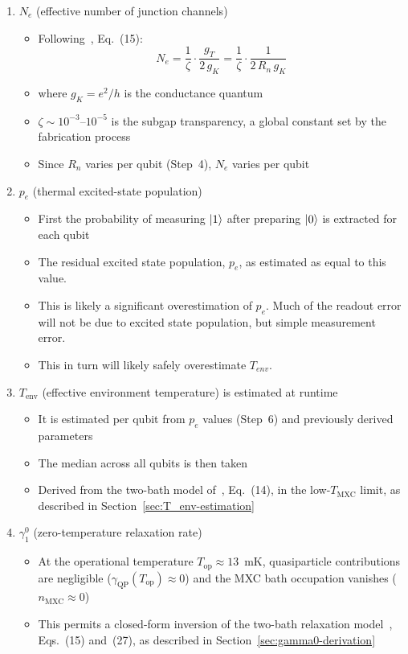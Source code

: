 \documentclass[showpacs,amsmath,amssymb,twocolumn,superscriptaddress,notitlepage,preprintnumbers,pra]{revtex4-1}
\begin{document}
\begin{enumerate}
	\item $N_e$ (effective number of junction channels)
	      \begin{itemize}
		      \item Following~\cite{catelani2012qp_diffusion}, Eq.~(15):
		            \[
			            N_e = \frac{1}{\zeta} \cdot \frac{g_T}{2\,g_K} = \frac{1}{\zeta} \cdot \frac{1}{2\,R_n\,g_K}
		            \]
		      \item where $g_K = e^2/h$ is the conductance quantum
		      \item $\zeta \sim 10^{-3}$--$10^{-5}$ is the subgap transparency, a global constant set by the fabrication process
		      \item Since $R_n$ varies per qubit (Step~4), $N_e$ varies per qubit
	      \end{itemize}

	\item $p_e$ (thermal excited-state population)
	      \begin{itemize}
		      \item First the probability of measuring $\ket{1}$ after preparing $\ket{0}$ is extracted for each qubit
		      \item The residual excited state population, $p_e$, as estimated as equal to this value.
		      \item This is likely a significant overestimation of $p_e$. Much of the readout error will not be due to excited state population, but simple measurement error.
		      \item This in turn will likely safely overestimate $T_{env}$.
	      \end{itemize}

	\item $T_\mathrm{env}$ (effective environment temperature) is estimated at runtime
	      \begin{itemize}
		      \item It is estimated per qubit from $p_e$ values (Step~6) and previously derived parameters
		      \item The median across all qubits is then taken
		      \item Derived from the two-bath model of~\cite{lvov2025thermometry}, Eq.~(14), in the low-$T_\mathrm{MXC}$ limit, as described in Section~\ref{sec:T_env-estimation}
	      \end{itemize}

	\item $\gamma_1^0$ (zero-temperature relaxation rate)
	      \begin{itemize}
		      \item At the operational temperature $T_\mathrm{op} \approx 13$~mK, quasiparticle contributions are negligible ($\gamma_\mathrm{QP}(T_\mathrm{op}) \approx 0$) and the MXC bath occupation vanishes ($n_\mathrm{MXC} \approx 0$)
		      \item This permits a closed-form inversion of the two-bath relaxation model~\cite{lvov2025thermometry}, Eqs.~(15) and~(27), as described in Section~\ref{sec:gamma0-derivation}
	      \end{itemize}


\end{enumerate}
\end{document}
